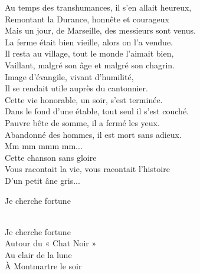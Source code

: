 \documentclass{novel}
\begin{document}
Au temps des transhumances, il s'en allait heureux, \\
Remontant la Durance, honnête et courageux \\
Mais un jour, de Marseille, des messieurs sont venus. \\
La ferme était bien vieille, alors on l'a vendue. \\

Il resta au village, tout le monde l'aimait bien, \\
Vaillant, malgré son âge et malgré son chagrin. \\
Image d'évangile, vivant d'humilité, \\
Il se rendait utile auprès du cantonnier. \\

Cette vie honorable, un soir, s'est terminée. \\
Dans le fond d'une étable, tout seul il s'est couché. \\
Pauvre bête de somme, il a fermé les yeux. \\
Abandonné des hommes, il est mort sans adieux. \\

Mm mm mmm mm... \\
Cette chanson sans gloire \\
Vous racontait la vie, vous racontait l'histoire \\
D'un petit âne gris...

\newpage
\normalsize
\h*{Je cherche fortune}

\begin{bfseries}
[Refrain:]\\
Je cherche fortune \\
Autour du « Chat Noir » \\
Au clair de la lune \\
À Montmartre le soir \\
\end{bfseries}
\end{document}
